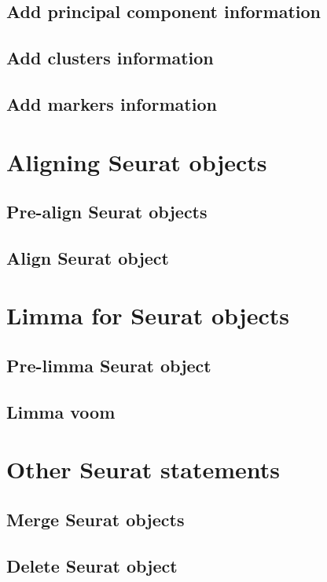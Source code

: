 \subsection{Add principal component information}
\subsection{Add clusters information}
\subsection{Add markers information}

\section{Aligning Seurat objects}
\subsection{Pre-align Seurat objects}
\subsection{Align Seurat object}

\section{Limma for Seurat objects}\label{sec:LimmaSeurat}
\subsection{Pre-limma Seurat object}
\subsection{Limma voom}

\section{Other Seurat statements}\label{sec:OtherSeuratStatements}
\subsection{Merge Seurat objects}
\subsection{Delete Seurat object}
